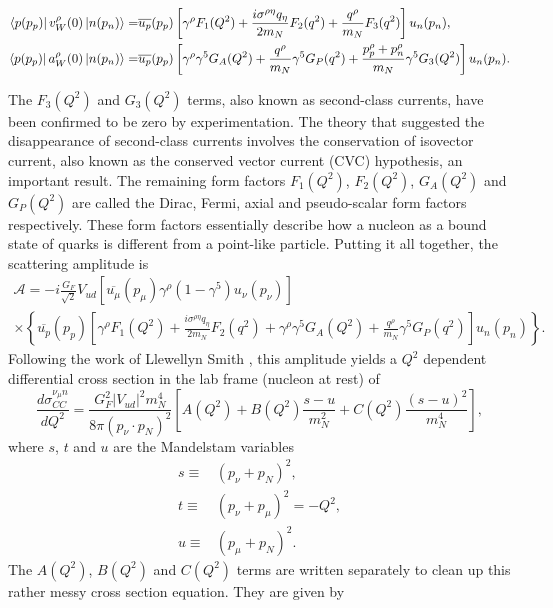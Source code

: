 \begin{align}
\bra{p(p_p)} v^\rho_W(0)\ket{n(p_n)} = & \overline{u_p}(p_p)\left[ \gamma^\rho F_1(Q^2) + \frac{i \sigma^{\rho\eta}q_\eta}{2 m_N} F_2(q^2) + \frac{q^\rho}{m_N}F_3(q^2)\right] u_n(p_n), \\
\bra{p(p_p)} a^\rho_W(0)\ket{n(p_n)} = & \overline{u_p}(p_p)\left[ \gamma^\rho \gamma^5 G_A(Q^2)  + \frac{q^\rho}{m_N} \gamma^5 G_P(q^2) + \frac{p^\rho_p+p^\rho_n}{m_N} \gamma^5 G_3(Q^2) \right] u_n(p_n).
\end{align}

The $F_3(Q^2)$ and $G_3(Q^2)$ terms, also known as second-class currents, have been confirmed to be zero by experimentation. The theory that suggested the disappearance of second-class currents involves the conservation of isovector current, also known as the conserved vector current (CVC) hypothesis, an important result. The remaining form factors $F_1(Q^2)$, $F_2(Q^2)$, $G_A(Q^2)$ and $G_P(Q^2)$ are called the Dirac, Fermi, axial and pseudo-scalar form factors respectively. These form factors essentially describe how a nucleon as a bound state of quarks is different from a point-like particle. Putting it all together, the scattering amplitude is 
\begin{multline}
\mathcal{A} = -i \frac{G_F}{\sqrt{2}}{V_{ud}}\left[\overline{u_\mu}(p_\mu)\gamma^\rho (1-\gamma^5)u_\nu(p_\nu)\right] \\ \times \left\{ \overline{u_p}(p_p)\left[ \gamma^\rho F_1(Q^2) + \frac{i \sigma^{\rho\eta}q_\eta}{2 m_N} F_2(q^2) +  \gamma^\rho \gamma^5 G_A(Q^2)  + \frac{q^\rho}{m_N} \gamma^5 G_P(q^2)\right] u_n(p_n) \right\}.
\end{multline}
Following the work of Llewellyn Smith \cite{LSCCQE}, this amplitude yields a $Q^2$ dependent differential cross section in the lab frame (nucleon at rest) of
\begin{equation}
\frac{d\sigma^{\nu_\mu n}_{CC}}{dQ^2} = \frac{G_F^2 |V_{ud}|^2 m_N^4}{8\pi (p_\nu \cdot p_N)^2} \left[ A(Q^2) + B(Q^2)\frac{s-u}{m_N^2} + C(Q^2)\frac{(s-u)^2}{m_N^4}\right],
\end{equation}
where $s$, $t$ and $u$ are the Mandelstam variables
\begin{align}
s \equiv & (p_\nu+p_N)^2,\\
t \equiv & (p_\nu+p_\mu)^2 = -Q^2,\\
u \equiv & (p_\mu+p_N)^2.
\end{align}
The $A(Q^2)$, $B(Q^2)$ and $C(Q^2)$ terms are written separately to clean up this rather messy cross section equation. They are given by


